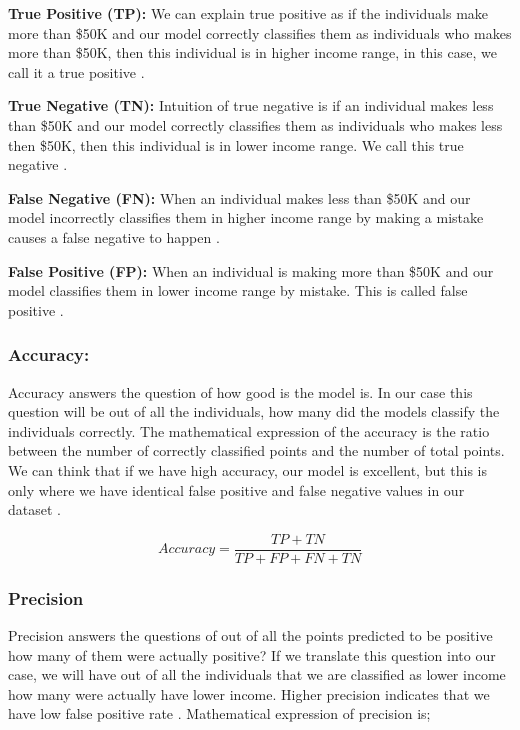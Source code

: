 \documentclass[sigconf]{acmart}
\begin{document}
\par \textbf{True Positive (TP):} We can explain true positive as if the individuals make more than \$50K and our model correctly classifies them as individuals who makes more than \$50K, then this individual is in higher income range, in this case, we call it a true positive \cite{www-exsilio}. 

\par \textbf{True Negative (TN):} Intuition of true negative is if an individual makes less than \$50K and our model correctly classifies them as individuals who makes less then \$50K, then this individual is in lower income range. We call this true negative \cite{www-exsilio}. 

\par \textbf{False Negative (FN):} When an individual makes less than \$50K and our model incorrectly classifies them in higher income range by making a mistake causes a false negative to happen \cite{www-exsilio}.

\par \textbf{False Positive (FP):} When an individual is making more than \$50K and our model classifies them in lower income range by mistake. This is called false positive \cite{www-exsilio}. 

\subsubsection{\textbf{Accuracy:}}
Accuracy answers the question of how good is the model is. In our case this question will be out of all the individuals, how many did the models classify the individuals correctly. The mathematical expression of the accuracy is the ratio between the number of correctly classified points and the number of total points. We can think that if we have high accuracy, our model is excellent, but this is only where we have identical false positive and false negative values in our dataset \cite{www-exsilio}.

\begin{equation}
Accuracy = \frac{TP + TN} {TP + FP + FN + TN}
\end{equation}

\subsubsection{\textbf{Precision}}
Precision answers the questions of out of all the points predicted to be positive how many of them were actually positive? If we translate this question into our case, we will have out of all the individuals that we are classified as lower income how many were actually have lower income. Higher precision indicates that we have low false positive rate \cite{www-exsilio}. Mathematical expression of precision is; 
\end{document}
